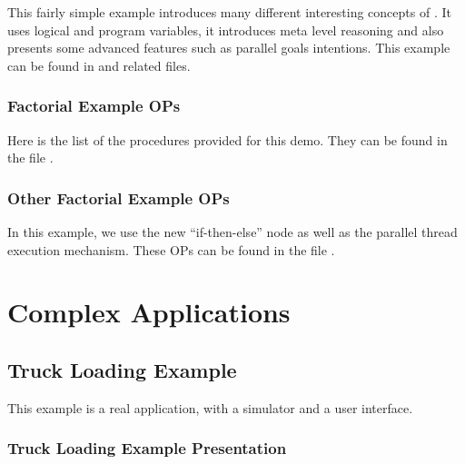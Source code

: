 This fairly simple example introduces many different interesting concepts
of \COPRS. It uses logical and program variables, it introduces meta level
reasoning and also presents some advanced features such as parallel
goals intentions. This example can be found in 
and related files.



\subsection{Factorial Example OPs}

Here is the list of the procedures provided for this demo. They can be found in
the file .



\subsection{Other Factorial Example OPs}

In this example, we use the new ``if-then-else'' node as well as the parallel
thread execution mechanism. These OPs can be found in the file
.



\chapter{Complex \COPRS{} Applications}




\section{Truck Loading Example}

This example is a real application, with a simulator and a user interface.



\subsection{Truck Loading Example Presentation}

